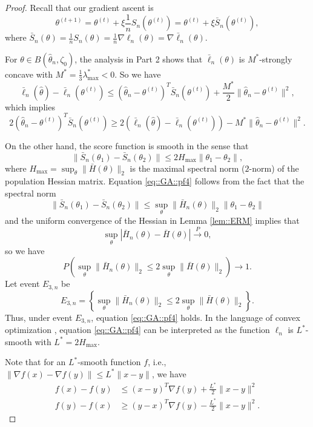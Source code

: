 \documentclass[aos, preprint]{imsart}
\theoremstyle{plain}
\theoremstyle{definition}
\let\hat\widehat
\begin{document}
\begin{appendix}
\begin{proof}
Recall that our gradient ascent is 
$$
\theta^{(t+1)} = \theta^{(t)} + \xi \frac{1}{n}S_n (\theta^{(t)}) = \theta^{(t)} + \xi \bar S_n (\theta^{(t)}), 
$$
where $\bar S_n(\theta) = \frac{1}{n}S_n(\theta) = \frac{1}{n}\nabla \ell_n(\theta) = \nabla \bar\ell_n(\theta)$. 


For $\theta \in B\left(\hat\theta_n,\zeta_0\right)$, the analysis in Part 2 shows that 
$\bar \ell_n(\theta)$ is $M^*$-strongly concave with $M^* = \frac{1}{3}\lambda^*_{\max}<0$. So we have 
$$
\bar \ell_n(\hat \theta) - \bar \ell_n(\theta^{(t)}) \leq (\hat \theta_n - \theta^{(t)})^T \bar S_n(\theta^{(t)}) + \frac{M^*}{2}\|\hat \theta_n - \theta^{(t)}\|^2,
$$
which implies
\begin{equation}
2(\hat \theta_n - \theta^{(t)})^T \bar S_n(\theta^{(t)}) \geq 2(\bar \ell_n(\hat \theta) - \bar \ell_n(\theta^{(t)})) - M^*\|\hat \theta_n - \theta^{(t)}\|^2.
\label{eq::GA::pf3}
\end{equation}

On the other hand, 
the score function is smooth 
in the sense that 
\begin{equation}
\|\bar S_n(\theta_1) - \bar S_n(\theta_2)\| \leq 2 H_{\max} \|\theta_1-\theta_2\|,
\label{eq::GA::pf4}
\end{equation}
where $H_{\max} = \sup_{\theta} \|\bar H(\theta)\|_2$ is the maximal spectral norm ($2$-norm) of the population Hessian matrix. 
Equation \eqref{eq::GA::pf4} follows from the fact that the spectral norm
$$
\|\bar S_n(\theta_1) - \bar S_n(\theta_2)\| \leq \sup_{\theta} \|\bar H_n(\theta)\|_2 \|\theta_1-\theta_2\|
$$
and the uniform convergence of the Hessian in Lemma \ref{lem::ERM}  implies that 
$$
\sup_{\theta}| \bar H_n(\theta) - \bar H(\theta)|\overset{P}{\rightarrow } 0 ,
$$
so we have 
$$
P\left(\sup_{\theta} \|\bar H_n(\theta)\|_2  \leq 2 \sup_{\theta}\|\bar H(\theta)\|_2\right) \rightarrow 1.
$$
Let event $E_{3,n}$ be
$$
E_{3,n} = \left\{\sup_{\theta} \|\bar H_n(\theta)\|_2  \leq 2 \sup_{\theta}\|\bar H(\theta)\|_2\right\}.
$$ 
Thus, under event $E_{3,n}$, equation \eqref{eq::GA::pf4} holds.
In the language of convex optimization \citep{boyd2004convex}, equation \eqref{eq::GA::pf4} can be interpreted as the function $\ell_n$ is $L^*$-smooth with $L^* = 2 H_{\max}$.

Note that for an $L^*$-smooth function $f$, i.e., $\|\nabla f(x) - \nabla f(y)\|\leq L^* \|x-y\|$, we have 
\begin{equation}
\begin{aligned}
f(x) - f(y) &\leq (x-y)^T \nabla f(y) + \frac{L^*}{2}\|x-y\|^2\\
f(y) - f(x) &\geq (y-x)^T \nabla f(y) - \frac{L^*}{2}\|x-y\|^2.
\end{aligned}
\label{eq::GA::pf5}
\end{equation}


\end{proof}
\end{appendix}
\end{document}
